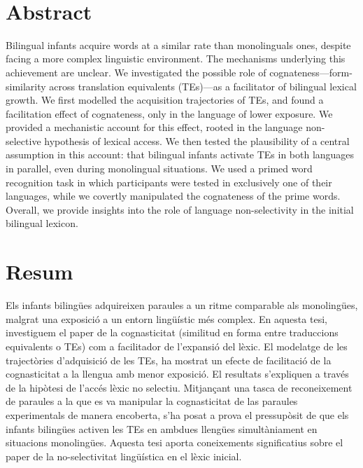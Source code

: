 \documentclass[
  12pt,
  b5paperpaper,
  twoside]{scrreprt}
\newcommand\blankpage{%
    \null
    \thispagestyle{empty}%
    \addtocounter{page}{-1}%
    \newpage
}
\begin{document}
\begin{spacing}{1.5}
\clearpage
~
\thispagestyle{empty}
\clearpage


\clearpage
\section*{\sffamily Abstract}
\normalsize{Bilingual infants acquire words at a similar rate than
monolinguals ones, despite facing a more complex linguistic environment.
The mechanisms underlying this achievement are unclear. We investigated
the possible role of cognateness---form-similarity across translation
equivalents (TEs)---as a facilitator of bilingual lexical growth. We
first modelled the acquisition trajectories of TEs, and found a
facilitation effect of cognateness, only in the language of lower
exposure. We provided a mechanistic account for this effect, rooted in
the language non-selective hypothesis of lexical access. We then tested
the plausibility of a central assumption in this account: that bilingual
infants activate TEs in both languages in parallel, even during
monolingual situations. We used a primed word recognition task in which
participants were tested in exclusively one of their languages, while we
covertly manipulated the cognateness of the prime words. Overall, we
provide insights into the role of language non-selectivity in the
initial bilingual lexicon.}
\vspace*{\baselineskip}
\clearpage


\clearpage
\section*{\sffamily Resum}
\normalsize{Els infants bilingües adquireixen paraules a un ritme
comparable als monolingües, malgrat una exposició a un entorn lingüístic
més complex. En aquesta tesi, investiguem el paper de la cognasticitat
(similitud en forma entre traduccions equivalents o TEs) com a
facilitador de l'expansió del lèxic. El modelatge de les trajectòries
d'adquisició de les TEs, ha mostrat un efecte de facilitació de la
cognasticitat a la llengua amb menor exposició. El resultats s'expliquen
a través de la hipòtesi de l'accés lèxic no selectiu. Mitjançant una
tasca de reconeixement de paraules a la que es va manipular la
cognasticitat de las paraules experimentals de manera encoberta, s'ha
posat a prova el pressupòsit de que els infants bilingües activen les
TEs en ambdues llengües simultàniament en situacions monolingües.
Aquesta tesi aporta coneixements significatius sobre el paper de la
no-selectivitat lingüística en el lèxic inicial.}
\afterpage{\blankpage}
\clearpage



\end{spacing}
\end{document}
